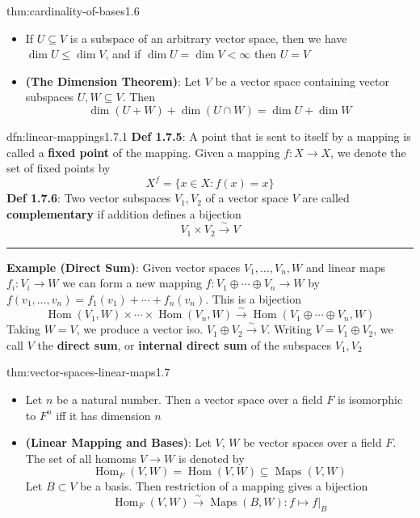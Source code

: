 \documentclass[landscape, 8pt]{extarticle}
\DeclareMathOperator{\Maps}{Maps}
\DeclareMathOperator{\Hom}{Hom}
\begin{document}
\begin{multicols}{3}
\begin{thm}{thm:cardinality-of-bases}{1.6}
\begin{itemize}
        \item[\textbf{1.6.9}] If $U \subseteq V$ is a subspace of an arbitrary vector space, then we have $\dim U \le \dim V$, and if $\dim U = \dim V < \infty$ then $U = V$
        \item[\textbf{1.6.10}] \textbf{(The Dimension Theorem)}: Let $V$ be a vector space containing vector subspaces $U,W\subseteq V$. Then
        \[\dim(U + W) + \dim(U \cap W) = \dim U + \dim W\]
    \end{itemize}
\end{thm}

\begin{dfn}{dfn:linear-mappings}{1.7.1}
    \textbf{Def 1.7.5}: A point that is sent to itself by a mapping is called a \textbf{fixed point} of the mapping. Given a mapping $f : X \to X$, we denote the set of fixed points by
    \[X^{f} = \{x \in X : f(x) = x\}\]
    \textbf{Def 1.7.6}: Two vector subspaces $V_{1}, V_{2}$ of a vector space $V$ are called \textbf{complementary} if addition defines a bijection
    \[V_{1} \times V_{2} \xrightarrow{\sim} V\]

    \noindent\rule{\textwidth}{0.2pt}

    \textbf{Example (Direct Sum)}: Given vector spaces $V_{1},\dots,V_{n}, W$ and linear maps $f_{i} : V_{i} \to W$ we can form a new mapping $f : V_{1} \oplus \cdots \oplus V_{n} \to W$ by $f(v_{1},\dots,v_{n}) = f_{1}(v_{1}) + \cdots + f_{n}(v_{n})$. This is a bijection
    \[\Hom(V_{1}, W) \times \cdots \times \Hom(V_{n}, W) \xrightarrow{\sim} \Hom(V_{1} \oplus \cdots \oplus V_{n}, W)\]
    Taking $W = V$, we produce a vector iso. $V_{1} \oplus V_{2} \xrightarrow{\sim} V$. Writing $V = V_{1} \oplus V_{2}$, we call $V$ the \textbf{direct sum}, or \textbf{internal direct sum} of the subspaces $V_{1}, V_{2}$

\end{dfn}

\begin{thm}{thm:vector-spaces-linear-maps}{1.7}
    \begin{itemize}
        \setlength\itemsep{0em}
        \item[\textbf{1.7.7}] Let $n$ be a natural number. Then a vector space over a field $F$ is isomorphic to $F^{n}$ iff it has dimension $n$
        \item[\textbf{1.7.8}] \textbf{(Linear Mapping and Bases)}: Let $V$, $W$ be vector spaces over a field $F$. The set of all homoms $V\to W$ is denoted by
        \[\Hom_{F}(V,W) = \Hom(V,W)\subseteq \Maps(V,W)\]
        Let $B \subset V$ be a basis. Then restriction of a mapping gives a bijection
            \[\Hom_{F}(V, W) \xrightarrow{\sim} \Maps(B, W) :
            f \mapsto f \lvert_{B}\]



\end{itemize}
\end{thm}
\end{multicols}
\end{document}
